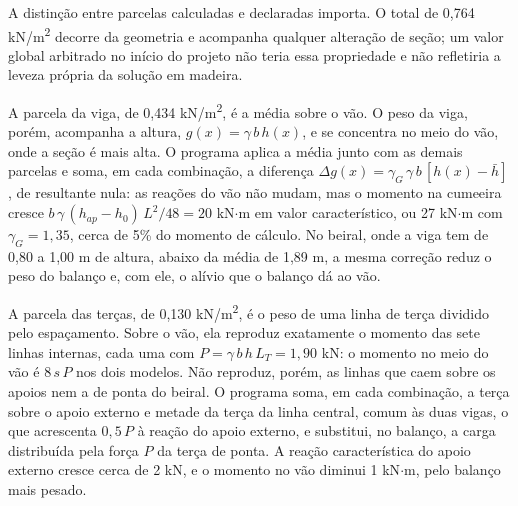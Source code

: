
A distinção entre parcelas calculadas e declaradas importa. O total de
0,764 kN/m\textsuperscript{2} decorre da geometria e acompanha qualquer alteração
de seção; um valor global arbitrado no início do projeto não teria essa
propriedade e não refletiria a leveza própria da solução em madeira.

A parcela da viga, de 0,434 kN/m\textsuperscript{2}, é a média sobre o vão. O peso
da viga, porém, acompanha a altura, $g(x) = \gamma\,b\,h(x)$, e se concentra no meio
do vão, onde a seção é mais alta. O programa aplica a média junto com as demais
parcelas e soma, em cada combinação, a diferença
$\Delta g(x) = \gamma_G\,\gamma\,b\,[h(x) - \bar{h}]$, de resultante nula: as reações
do vão não mudam, mas o momento na cumeeira cresce
$b\,\gamma\,(h_{ap} - h_0)\,L^2/48 = 20$ kN$\cdot$m em valor característico, ou 27
kN$\cdot$m com $\gamma_G = 1{,}35$, cerca de 5\% do momento de cálculo. No beiral,
onde a viga tem de 0,80 a 1,00 m de altura, abaixo da média de 1,89 m, a mesma
correção reduz o peso do balanço e, com ele, o alívio que o balanço dá ao vão.

A parcela das terças, de 0,130 kN/m\textsuperscript{2}, é o peso de uma linha
de terça dividido pelo espaçamento. Sobre o vão, ela reproduz exatamente o
momento das sete linhas internas, cada uma com
$P = \gamma\,b\,h\,L_T = 1{,}90$ kN: o momento no meio do vão é $8\,s\,P$ nos
dois modelos. Não reproduz, porém, as linhas que caem sobre os apoios nem a de
ponta do beiral. O programa soma, em cada combinação, a terça sobre o apoio
externo e metade da terça da linha central, comum às duas vigas, o que acrescenta
$0{,}5\,P$ à reação do apoio externo, e substitui, no balanço, a carga
distribuída pela força $P$ da terça de ponta. A reação característica do apoio
externo cresce cerca de 2 kN, e o momento no vão diminui 1 kN$\cdot$m, pelo
balanço mais pesado.

